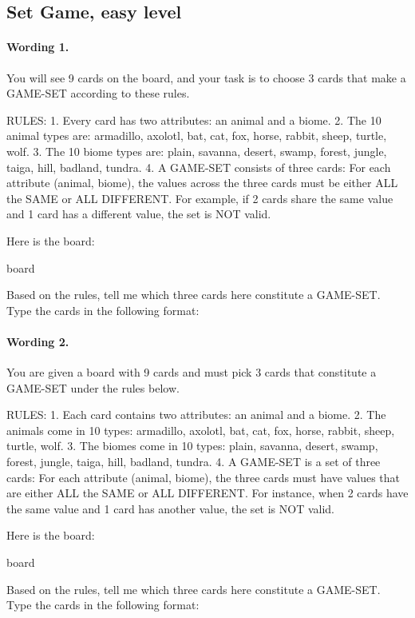 
\subsection*{Set Game, easy level}

\paragraph{Wording 1.}
\begin{promptbox}
You will see 9 cards on the board, and your task is to choose 3 cards that make a GAME-SET according to these rules.

RULES:
1. Every card has two attributes: an animal and a biome.
2. The 10 animal types are: armadillo, axolotl, bat, cat, fox, horse, rabbit, sheep, turtle, wolf.
3. The 10 biome types are: plain, savanna, desert, swamp, forest, jungle, taiga, hill, badland, tundra.
4. A GAME-SET consists of three cards: For each attribute (animal, biome), the values across the three cards must be either ALL the SAME or ALL DIFFERENT. For example, if 2 cards share the same value and 1 card has a different value, the set is NOT valid.

Here is the board:

{board}

Based on the rules, tell me which three cards here constitute a GAME-SET. Type the cards in the following format:
\end{promptbox}

\paragraph{Wording 2.}
\begin{promptbox}
You are given a board with 9 cards and must pick 3 cards that constitute a GAME-SET under the rules below.

RULES:
1. Each card contains two attributes: an animal and a biome.
2. The animals come in 10 types: armadillo, axolotl, bat, cat, fox, horse, rabbit, sheep, turtle, wolf.
3. The biomes come in 10 types: plain, savanna, desert, swamp, forest, jungle, taiga, hill, badland, tundra.
4. A GAME-SET is a set of three cards: For each attribute (animal, biome), the three cards must have values that are either ALL the SAME or ALL DIFFERENT. For instance, when 2 cards have the same value and 1 card has another value, the set is NOT valid.

Here is the board:

{board}

Based on the rules, tell me which three cards here constitute a GAME-SET. Type the cards in the following format:
\end{promptbox}

